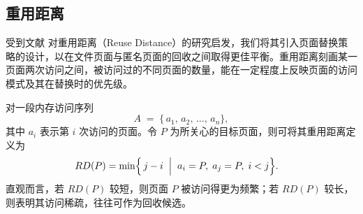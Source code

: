 



\subsection{重用距离}

受到文献 \cite{jiang2002lirs,jiang2005clockpro} 对重用距离（Reuse Distance）的研究启发，我们将其引入页面替换策略的设计，以在文件页面与匿名页面的回收之间取得更佳平衡。重用距离刻画某一页面两次访问之间，被访问过的不同页面的数量，能在一定程度上反映页面的访问模式及其在替换时的优先级。

对一段内存访问序列
\[
  A \;=\;\{\,a_1,\,a_2,\,\dots,\,a_n\},
\]
其中 \(a_i\) 表示第 \(i\) 次访问的页面。令 \(P\) 为所关心的目标页面，则可将其重用距离定义为
\begin{align}
\label{eq:rd_def}
  RD(P) 
  &= 
  \min\Bigl\{\,j - i
    \;\Bigm|\;
    a_i = P,\;
    a_j = P,\;
    i < j
  \Bigr\}.
\end{align}
直观而言，若 \(RD(P)\) 较短，则页面 \(P\) 被访问得更为频繁；若 \(RD(P)\) 较长，则表明其访问稀疏，往往可作为回收候选。

